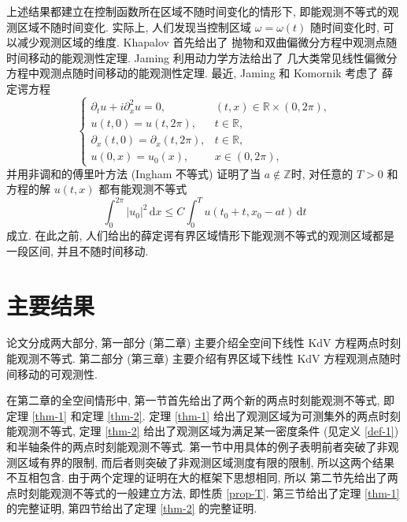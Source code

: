 \documentclass[master]{cugthesis}
\newcommand\R{\ensuremath{\mathbb{R}}}
\newcommand\Z{\ensuremath{\mathbb{Z}}}
\renewcommand\d{\ensuremath{\,\mathrm{d}}}
\begin{document}
   上述结果都建立在控制函数所在区域不随时间变化的情形下, 即能观测不等式的观测区域不随时间变化. 实际上, 人们发现当控制区域 $\omega=\omega(t)$ 随时间变化时, 可以减少观测区域的维度. Khapalov 首先给出了 \cite{khapalov1995exact,khapalov2017mobile}  抛物和双曲偏微分方程中观测点随时间移动的能观测性定理. Jaming 利用动力学方法给出了\cite{jaming2018dynamical} 几大类常见线性偏微分方程中观测点随时间移动的能观测性定理.
   最近, Jaming 和 Komornik 考虑了\cite{jaming2020moving} 薛定谔方程
   \begin{equation}
   \left\lbrace
   \begin{array}{ll}
              \partial_t u+ i\partial_x^2 u = 0,  & (t,x)\in \R \times (0,2\pi),  \\
       u(t,0)=u(t,2\pi), & t\in \R,\\
       \partial_x(t,0)=\partial_x(t,2\pi), & t\in \R,\\
       u(0,x)=u_0(x), & x\in (0,2\pi),
   \end{array}
   \right.
   \end{equation}
   并用非调和的傅里叶方法 (Ingham 不等式) 证明了当 $a\notin \Z$时, 对任意的 $T>0$ 和方程的解 $u(t,x)$ 都有能观测不等式
   \begin{equation}
       \int_0^{2\pi}|u_0|^2\d x \le C \int_0^T u(t_0+t,x_0-at) \d t
   \end{equation}
   成立. 在此之前, 人们给出的薛定谔有界区域情形下能观测不等式的观测区域都是一段区间, 并且不随时间移动. 
 
 \section{主要结果}
 论文分成两大部分, 第一部分 (第二章) 主要介绍全空间下线性 KdV 方程两点时刻能观测不等式. 第二部分 (第三章) 主要介绍有界区域下线性 KdV 方程观测点随时间移动的可观测性.
 
 在第二章的全空间情形中, 第一节首先给出了两个新的两点时刻能观测不等式, 即定理 \ref{thm-1} 和定理 \ref{thm-2}. 定理 \ref{thm-1} 给出了观测区域为可测集外的两点时刻能观测不等式, 定理 \ref{thm-2} 给出了观测区域为满足某一密度条件 (见定义 \ref{def-1}) 和半轴条件的两点时刻能观测不等式. 第一节中用具体的例子表明前者突破了非观测区域有界的限制, 而后者则突破了非观测区域测度有限的限制, 所以这两个结果不互相包含. 由于两个定理的证明在大的框架下思想相同, 所以 第二节先给出了两点时刻能观测不等式的一般建立方法, 即性质 \ref{prop-T}. 第三节给出了定理 \ref{thm-1} 的完整证明, 第四节给出了定理 \ref{thm-2} 的完整证明.
 
\iffalse 在第三章的有界区域情形中, 第一节首先介绍了 Ingham 不等式及其推广形式, 第二节介绍并证明观测点随时间移动的能观测性定理的主要结果, 即定理 \ref{thm3-2-1}, 定理 \ref{thm-3-2-2} 和定理 \ref{thm-3-2-3}. 定理 \ref{thm3-2-1}
 给出了单个观测点随时间移动的能观测不等式, 证明遵循了 \cite{jaming2020moving} 中对薛定谔方程的处理方法, 即利用观测线段所构成的函数其傅里叶系数的一致分离性. 定理 \ref{thm-3-2-2} 利用Eisenstein 整环的唯一分解性给出了观测区域为两个不同速率移动观测点的能观测不等式判定方法, 并给出了此情形下最简单的反例, 两个移动观测点观测值为零无法推出解函数为零. 由于基于整环唯一分解性的判定方法在大数情形下缺乏可行性, 定理 \ref{thm-3-2-3} 利用 KdV 方程的色散特性给出了更加容易的判定方法.
 \fi 
\end{document}
